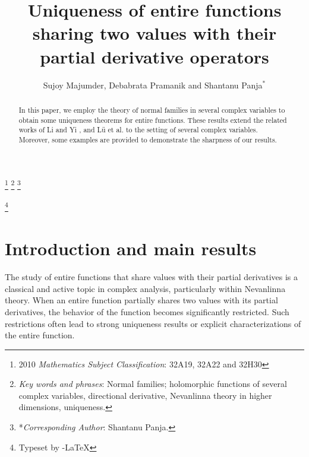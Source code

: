 \documentclass[11pt, reqno]{amsart}
\newtheorem*{cor A}{Corollary A}
\newtheorem*{cor B}{Corollary B}
\numberwithin{equation}{section}
\begin{document}
\title[U\MakeLowercase {niqueness of entire functions}......]{\LARGE U\Large\MakeLowercase {niqueness of entire functions sharing two values with their partial derivative operators}}

\date{}
\author[S. M\MakeLowercase {ajumder}, D. P\MakeLowercase {ramanik} \MakeLowercase{and} S. P\MakeLowercase{anja}]{S\MakeLowercase {ujoy} M\MakeLowercase {ajumder}, D\MakeLowercase {ebabrata} P\MakeLowercase {ramanik} \MakeLowercase{and} S\MakeLowercase{hantanu} P\MakeLowercase{anja}$^*$}
\address{Department of Mathematics, Raiganj University, Raiganj, West Bengal-733134, India.}
\address{Department of Mathematics, Raiganj University, Raiganj, West Bengal-733134, India.}
\address{Department of Mathematics, University of Kalyani, West Bengal 741235, India.}




\renewcommand{\thefootnote}{}
\footnote{2010 \emph{Mathematics Subject Classification}: 32A19, 32A22 and 32H30}
\footnote{\emph{Key words and phrases}: Normal families; holomorphic functions of several complex variables, directional derivative, Nevanlinna theory in higher dimensions, uniqueness.}
\footnote{*\emph{Corresponding Author}: Shantanu Panja.}

\renewcommand{\thefootnote}{\arabic{footnote}}

\setcounter{footnote}{0}

\begin{abstract} In this paper, we employ the theory of normal families in several complex variables to obtain some uniqueness theorems for entire functions. These results extend the related works of Li and Yi \cite{Li-Yi-2006}, and L\"{u} et al. \cite{Lu-Xu-Yi-2009} to the setting of several complex variables. Moreover, some examples are provided to demonstrate the sharpness of our results.
\end{abstract}
\thanks{Typeset by \AmS -\LaTeX}
\maketitle

\section{{\bf Introduction and main results}}
The study of entire functions that share values with their partial derivatives is a classical and active topic in complex analysis, particularly within Nevanlinna theory. When an entire function partially shares two values with its partial derivatives, the behavior of the function becomes significantly restricted. Such restrictions often lead to strong uniqueness results or explicit characterizations of the entire function.
\end{document}
